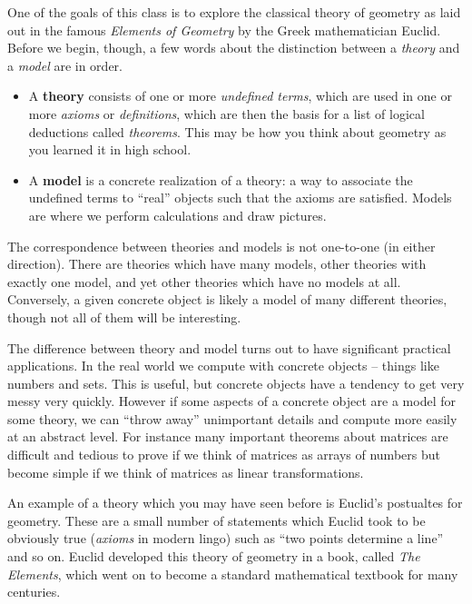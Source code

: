 One of the goals of this class is to explore the classical theory of geometry as laid out in the famous \emph{Elements of Geometry} by the Greek mathematician Euclid. Before we begin, though, a few words about the distinction between a \emph{theory} and a \emph{model} are in order.

\begin{itemize}
\item A \textbf{theory} consists of one or more \emph{undefined terms}, which are used in one or more \emph{axioms} or \emph{definitions}, which are then the basis for a list of logical deductions called \emph{theorems}. This may be how you think about geometry as you learned it in high school.

\item A \textbf{model} is a concrete realization of a theory: a way to associate the undefined terms to ``real'' objects such that the axioms are satisfied. Models are where we perform calculations and draw pictures.
\end{itemize}

The correspondence between theories and models is not one-to-one (in either direction). There are theories which have many models, other theories with exactly one model, and yet other theories which have no models at all. Conversely, a given concrete object is likely a model of many different theories, though not all of them will be interesting.

The difference between theory and model turns out to have significant practical applications. In the real world we compute with concrete objects -- things like numbers and sets. This is useful, but concrete objects have a tendency to get very messy very quickly. However if some aspects of a concrete object are a model for some theory, we can ``throw away'' unimportant details and compute more easily at an abstract level. For instance many important theorems about matrices are difficult and tedious to prove if we think of matrices as arrays of numbers but become simple if we think of matrices as linear transformations.

An example of a theory which you may have seen before is Euclid's postualtes for geometry. These are a small number of statements which Euclid took to be obviously true (\emph{axioms} in modern lingo) such as ``two points determine a line'' and so on. Euclid developed this theory of geometry in a book, called \emph{The Elements}, which went on to become a standard mathematical textbook for many centuries.

